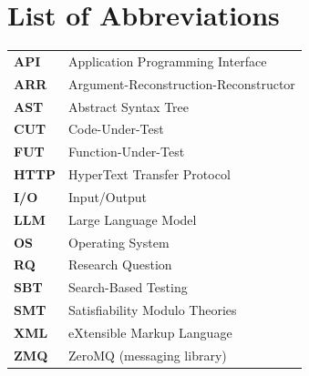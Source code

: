 \chapter{List of Abbreviations}

\def\arraystretch{1.5}
\begin{longtable}[l]{l l}
    \textbf{API}     & Application Programming Interface                                 \\
    \textbf{ARR}     & Argument-Reconstruction-Reconstructor                             \\
    \textbf{AST}     & Abstract Syntax Tree                                              \\
    \textbf{CUT}     & Code-Under-Test                                                   \\
    \textbf{FUT}     & Function-Under-Test                                               \\
    \textbf{HTTP}    & HyperText Transfer Protocol                                       \\
    \textbf{I/O}     & Input/Output                                                      \\
    \textbf{LLM}     & Large Language Model                                              \\
    \textbf{OS}      & Operating System                                                  \\
    \textbf{RQ}      & Research Question                                                 \\
    \textbf{SBT}     & Search-Based Testing                                              \\
    \textbf{SMT}     & Satisfiability Modulo Theories                                    \\
    \textbf{XML}     & eXtensible Markup Language                                        \\
    \textbf{ZMQ}     & ZeroMQ (messaging library)                                        \\
\end{longtable}
\def\arraystretch{1}